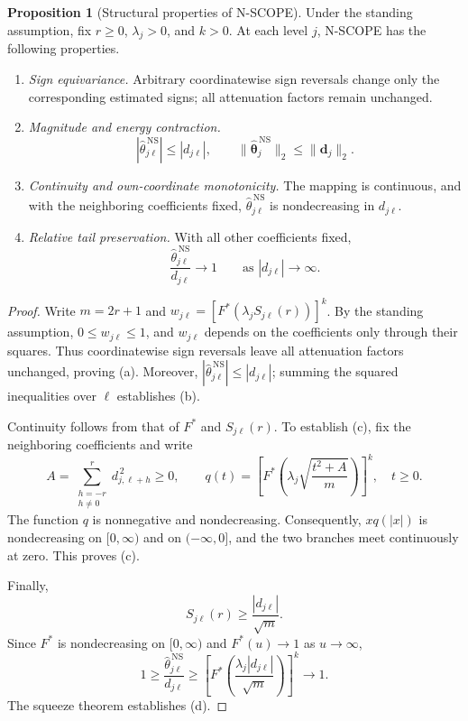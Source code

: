 \documentclass[12pt]{article}
\theoremstyle{definition}
\newtheorem{proposition}{Proposition}
\theoremstyle{definition}
\begin{document}
\begin{proposition}[Structural properties of N-SCOPE]
\label{prop:nscope-structure}
Under the standing assumption, fix $r\ge0$, $\lambda_j>0$, and $k>0$.
At each level $j$, N-SCOPE has the following properties.
\begin{enumerate}
\item[(a)] \emph{Sign equivariance.} Arbitrary coordinatewise sign
reversals change only the corresponding estimated signs; all
attenuation factors remain unchanged.
\item[(b)] \emph{Magnitude and energy contraction.}
\begin{equation}
|\widehat\theta_{j\ell}^{\,\mathrm{NS}}|\le|d_{j\ell}|,
\qquad
\|\widehat{\boldsymbol\theta}_j^{\,\mathrm{NS}}\|_2
\le\|\boldsymbol d_j\|_2.
\label{eq:nscope-contract}
\end{equation}
\item[(c)] \emph{Continuity and own-coordinate monotonicity.} The
mapping is continuous, and with the neighboring coefficients fixed,
$\widehat\theta_{j\ell}^{\,\mathrm{NS}}$ is nondecreasing in $d_{j\ell}$.
\item[(d)] \emph{Relative tail preservation.} With all other
coefficients fixed,
\begin{equation}
\frac{\widehat\theta_{j\ell}^{\,\mathrm{NS}}}{d_{j\ell}}
\longrightarrow1\qquad\text{as }|d_{j\ell}|\to\infty.
\label{eq:nscope-tail}
\end{equation}
\end{enumerate}
\end{proposition}

 
\begin{proof}
Write $m=2r+1$ and
$w_{j\ell}=[F^*(\lambda_jS_{j\ell}(r))]^k$.
By the standing assumption, $0\le w_{j\ell}\le1$,
and $w_{j\ell}$ depends on the coefficients only
through their squares. Thus coordinatewise sign
reversals leave all attenuation factors unchanged,
proving (a). Moreover,
$|\widehat\theta_{j\ell}^{\,\mathrm{NS}}|
\le |d_{j\ell}|$; summing the squared inequalities
over $\ell$ establishes (b).

Continuity follows from that of $F^*$ and
$S_{j\ell}(r)$. To establish (c), fix the neighboring
coefficients and write
$$
A=\sum_{\substack{h=-r\\h\ne0}}^r
d_{j,\ell+h}^{\,2}\ge0,
\qquad
q(t)=\left[
F^*\!\left(\lambda_j
\sqrt{\frac{t^2+A}{m}}\right)
\right]^k,\quad t\ge0.
$$
The function $q$ is nonnegative and nondecreasing.
Consequently, $xq(|x|)$ is nondecreasing on
$[0,\infty)$ and on $(-\infty,0]$, and the
two branches meet continuously at zero.
This proves (c).

Finally,
$$
S_{j\ell}(r)\ge
\frac{|d_{j\ell}|}{\sqrt m}.
$$
Since $F^*$ is nondecreasing on $[0,\infty)$
and $F^*(u)\to1$ as $u\to\infty$,
$$
1\ge
\frac{\widehat\theta_{j\ell}^{\,\mathrm{NS}}}
{d_{j\ell}}
\ge
\left[
F^*\!\left(
\frac{\lambda_j|d_{j\ell}|}{\sqrt m}
\right)
\right]^k
\longrightarrow1.
$$
The squeeze theorem establishes (d).
\end{proof}
 
\end{document}
